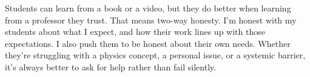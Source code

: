 \documentclass[12pt,letterpaper]{article}
\begin{document}
Students can learn from a book or a video, but they do better when learning from a professor they trust. That means two-way honesty. I'm honest with my students about what I expect, and how their work lines up with those expectations. I also push them to be honest about their own needs. Whether they're struggling with a physics concept, a personal issue, or a systemic barrier, it's always better to ask for help rather than fail silently.

\end{document}
